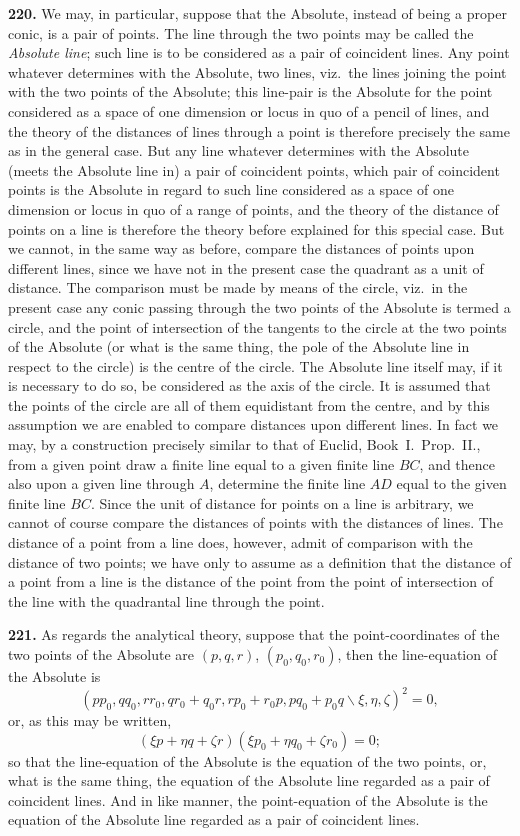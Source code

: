 \documentclass[11pt,a4paper]{book}
\begin{document}
\begin{center}
\textbf{220.} We may, in particular, suppose that the Absolute, instead of being a proper
conic, is a pair of points. The line through the two points may be called the \textit{Absolute
line}; such line is to be considered as a pair of coincident lines. Any point whatever
determines with the Absolute, two lines, viz.\ the lines joining the point with the two
points of the Absolute; this line-pair is the Absolute for the point considered as a
space of one dimension or locus in quo of a pencil of lines, and the theory of the
distances of lines through a point is therefore precisely the same as in the general case.
But any line whatever determines with the Absolute (meets the Absolute line in) a
pair of coincident points, which pair of coincident points is the Absolute in regard to
such line considered as a space of one dimension or locus in quo of a range of points,
and the theory of the distance of points on a line is therefore the theory before
explained for this special case. But we cannot, in the same way as before, compare
the distances of points upon different lines, since we have not in the present case the
quadrant as a unit of distance. The comparison must be made by means of the circle,
viz.\ in the present case any conic passing through the two points of the Absolute is
termed a circle, and the point of intersection of the tangents to the circle at the two
points of the Absolute (or what is the same thing, the pole of the Absolute line in
respect to the circle) is the centre of the circle. The Absolute line itself may, if it is
necessary to do so, be considered as the axis of the circle. It is assumed that the
points of the circle are all of them equidistant from the centre, and by this assumption
we are enabled to compare distances upon different lines. In fact we may, by a
construction precisely similar to that of Euclid, Book~I.\ Prop.~II., from a given point
draw a finite line equal to a given finite line $BC$, and thence also upon a given line
through $A$, determine the finite line $AD$ equal to the given finite line $BC$. Since the
unit of distance for points on a line is arbitrary, we cannot of course compare the
distances of points with the distances of lines. The distance of a point from a line
does, however, admit of comparison with the distance of two points; we have only to
assume as a definition that the distance of a point from a line is the distance of the
point from the point of intersection of the line with the quadrantal line through the
point.

\textbf{221.} As regards the analytical theory, suppose that the point-coordinates of the
two points of the Absolute are $(p,q,r)$, $(p_0,q_0,r_0)$, then the line-equation of the Absolute is
\[
(pp_0, qq_0, rr_0, qr_0+q_0r, rp_0+r_0p, pq_0+p_0q\!\backslash \xi,\eta,\zeta)^2 = 0,
\]
or, as this may be written,
\[
(\xi p+\eta q+\zeta r)(\xi p_0+\eta q_0+\zeta r_0) = 0;
\]
so that the line-equation of the Absolute is the equation of the two points, or, what
is the same thing, the equation of the Absolute line regarded as a pair of coincident
lines. And in like manner, the point-equation of the Absolute is the equation of the
Absolute line regarded as a pair of coincident lines.


\end{center}
\end{document}
